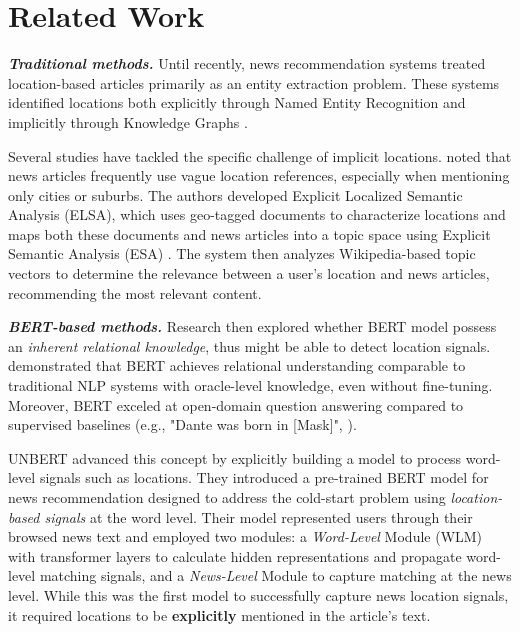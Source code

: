 \section{Related Work}
\textbf{\textit{Traditional methods.}} Until recently, news recommendation systems treated location-based articles primarily as an entity extraction problem. These systems identified locations both explicitly through Named Entity Recognition \cite{de2015semantics, fudholi2023bert, li2020deep} and implicitly through Knowledge Graphs \cite{wang2018ripplenet, wang2019multi, wang2018dkn, wang2019exploring}.

Several studies have tackled the specific challenge of implicit locations. \cite{son2013location} noted that news articles frequently use vague location references, especially when mentioning only cities or suburbs. The authors developed Explicit Localized Semantic Analysis (ELSA), which uses geo-tagged documents to characterize locations and maps both these documents and news articles into a topic space using Explicit Semantic Analysis (ESA) \cite{gabrilovich2009wikipedia}. The system then analyzes Wikipedia-based topic vectors to determine the relevance between a user's location and news articles, recommending the most relevant content.


\textbf{\textit{BERT-based methods.}} Research then explored whether BERT \cite{kenton2019bert} model possess an \textit{inherent relational knowledge}, thus might be able to detect location signals. \cite{petroni2019language} demonstrated that BERT achieves relational understanding comparable to traditional NLP systems with oracle-level knowledge, even without fine-tuning. Moreover, BERT exceled at open-domain question answering compared to supervised baselines (e.g., "Dante was born in [Mask]", \cite{petroni2019language}).

UNBERT \cite{zhang2021unbert} advanced this concept by explicitly building a model to process word-level signals such as locations. They introduced a pre-trained BERT model for news recommendation designed to address the cold-start problem using \textit{location-based signals} at the word level. Their model represented users through their browsed news text and employed two modules: a \textit{Word-Level} Module (WLM) with transformer layers to calculate hidden representations and propagate word-level matching signals, and a \textit{News-Level} Module to capture matching at the news level. While this was the first model to successfully capture news location signals, it required locations to be \textbf{explicitly} mentioned in the article's text.

